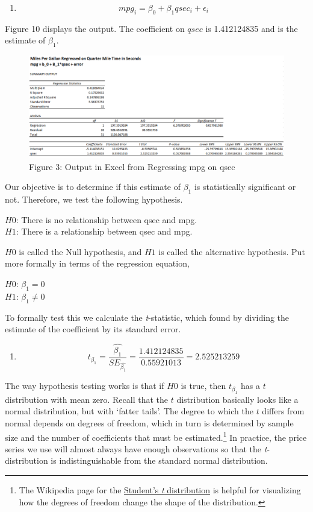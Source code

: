 \documentclass[]{book}
\providecommand{\tightlist}{%
  \setlength{\itemsep}{0pt}\setlength{\parskip}{0pt}}
\let\rmarkdownfootnote\footnote%
\def\footnote{\protect\rmarkdownfootnote}
\theoremstyle{definition}
\theoremstyle{definition}
\theoremstyle{remark}
\begin{document}
\begin{enumerate}
\def\labelenumi{\arabic{enumi}.}
\setcounter{enumi}{9}
\tightlist
\item
  \[mpg_i = \beta_0 + \beta_1qsec_i + \epsilon_i\]
\end{enumerate}

Figure 10 displays the output. The coefficient on \(qsec\) is
1.412124835 and is the estimate of \(\beta_1\).

\begin{figure}[htbp]
\centering
\includegraphics{images/mpg_on_qsec.png}
\caption{Figure 3: Output in Excel from Regressing mpg on qsec}
\end{figure}

Our objective is to determine if this estimate of \(\beta_1\) is
statistically significant or not. Therefore, we test the following
hypothesis.

\(H0\): There is no relationship between qsec and mpg.\\
\(H1\): There is a relationship between qsec and mpg.

\(H0\) is called the Null hypothesis, and \(H1\) is called the
alternative hypothesis. Put more formally in terms of the regression
equation,

\(H0\): \(\beta_1 = 0\)\\
\(H1\): \(\beta_1 \neq 0\)

To formally test this we calculate the \emph{t}-statistic, which found
by dividing the estimate of the coefficient by its standard error.

\begin{enumerate}
\def\labelenumi{\arabic{enumi}.}
\setcounter{enumi}{10}
\tightlist
\item
  \[t_{\beta_1} = \frac{\hat{\beta_1}}{SE_{\hat{\beta_1}}} = \frac{1.412124835}{0.55921013} = 2.525213259\]
\end{enumerate}

The way hypothesis testing works is that if \(H0\) is true, then
\(t_{\beta_1}\) has a \(t\) distribution with mean zero. Recall that the
\(t\) distribution basically looks like a normal distribution, but with
`fatter tails'. The degree to which the \(t\) differs from normal
depends on degrees of freedom, which in turn is determined by sample
size and the number of coefficients that must be estimated.\footnote{The
  Wikipedia page for the
  \href{https://en.wikipedia.org/wiki/Student\%27s_t-distribution}{Student's
  \emph{t} distribution} is helpful for visualizing how the degrees of
  freedom change the shape of the distribution.} In practice, the price
series we use will almost always have enough observations so that the
\emph{t}-distribution is indistinguishable from the standard normal
distribution.
\end{document}
